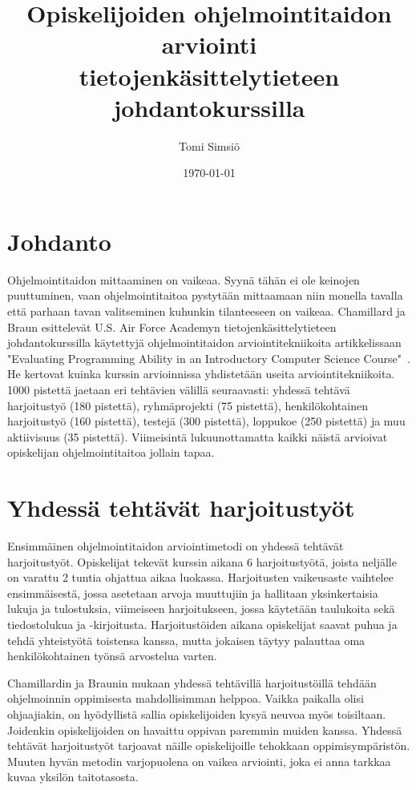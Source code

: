 \documentclass[finnish]{../tktltiki2}
\title{Opiskelijoiden ohjelmointitaidon arviointi\\tietojenkäsittelytieteen johdantokurssilla}
\author{Tomi Simsiö}
\date{\today}
\theoremstyle{definition}
\theoremstyle{remark}
\begin{document}

\maketitle
\tableofcontents
\newpage



\section{Johdanto}

Ohjelmointitaidon mittaaminen on vaikeaa. Syynä tähän ei ole keinojen puuttuminen, vaan ohjelmointitaitoa pystytään mittaamaan niin monella tavalla että parhaan tavan valitseminen kuhunkin tilanteeseen on vaikeaa. Chamillard ja Braun esittelevät U.S. Air Force Academyn tietojenkäsittelytieteen johdantokurssilla käytettyjä ohjelmointitaidon arviointitekniikoita artikkelissaan "Evaluating Programming Ability in an Introductory Computer Science Course"~\cite{CB00}. He kertovat kuinka kurssin arvioinnissa yhdistetään useita arviointitekniikoita. 1000 pistettä jaetaan eri tehtävien välillä seuraavasti: yhdessä tehtävä harjoitustyö (180 pistettä), ryhmäprojekti (75 pistettä), henkilökohtainen harjoitustyö (160 pistettä), testejä (300 pistettä), loppukoe (250 pistettä) ja muu aktiivisuus (35 pistettä). Viimeisintä lukuunottamatta kaikki näistä arvioivat opiskelijan ohjelmointitaitoa jollain tapaa.

\section{Yhdessä tehtävät harjoitustyöt}

Ensimmäinen ohjelmointitaidon arviointimetodi on yhdessä tehtävät harjoitustyöt. Opiskelijat tekevät kurssin aikana 6 harjoitustyötä, joista neljälle on varattu 2 tuntia ohjattua aikaa luokassa. Harjoitusten vaikeusaste vaihtelee ensimmäisestä, jossa asetetaan arvoja muuttujiin ja hallitaan yksinkertaisia lukuja ja tulostuksia, viimeiseen harjoitukseen, jossa käytetään taulukoita sekä tiedostolukua ja -kirjoitusta. Harjoitustöiden aikana opiskelijat saavat puhua ja tehdä yhteistyötä toistensa kanssa, mutta jokaisen täytyy palauttaa oma henkilökohtainen työnsä arvostelua varten.

Chamillardin ja Braunin mukaan yhdessä tehtävillä harjoitustöillä tehdään ohjelmoinnin oppimisesta mahdollisimman helppoa. Vaikka paikalla olisi ohjaajiakin, on hyödyllistä sallia opiskelijoiden kysyä neuvoa myös toisiltaan. Joidenkin opiskelijoiden on havaittu oppivan paremmin muiden kanssa. Yhdessä tehtävät harjoitustyöt tarjoavat näille opiskelijoille tehokkaan oppimisympäristön. Muuten hyvän metodin varjopuolena on vaikea arviointi, joka ei anna tarkkaa kuvaa yksilön taitotasosta.
\end{document}
